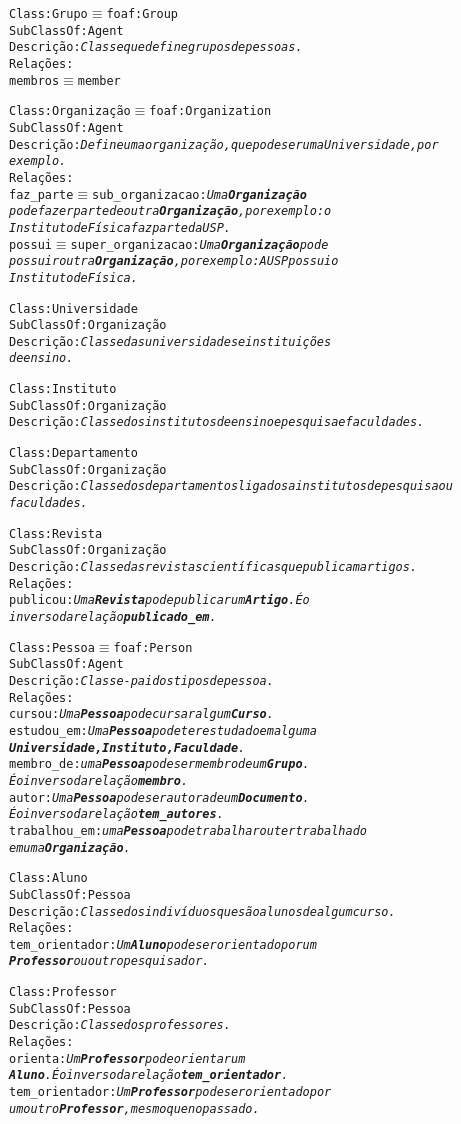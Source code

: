 \begin{alltt}
Class: Grupo \( \equiv \) foaf:Group
SubClassOf: Agent
Descrição: \emph{Classe que define grupos de pessoas.}
Relações:
  membros \( \equiv \) member

Class: Organização \( \equiv \) foaf:Organization
SubClassOf: Agent
Descrição: \emph{Define uma organização, que pode ser uma Universidade, por
exemplo.}
Relações:
  faz_parte \( \equiv \) sub_organizacao: \emph{Uma \textbf{Organização}
  pode fazer parte de outra \textbf{Organização}, por exemplo: o
  Instituto de Física faz parte da USP.}
  possui \( \equiv \) super_organizacao: \emph{Uma \textbf{Organização} pode
  possuir outra \textbf{Organização}, por exemplo: A USP possui o
  Instituto de Física.}

Class: Universidade
SubClassOf: Organização
Descrição: \emph{Classe das universidades e instituições
de ensino.}

Class:Instituto
SubClassOf: Organização
Descrição: \emph{Classe dos institutos de ensino e pesquisa e faculdades.}

Class: Departamento
SubClassOf: Organização
Descrição: \emph{Classe dos departamentos ligados a institutos de pesquisa ou
faculdades.}

Class: Revista
SubClassOf: Organização
Descrição: \emph{Classe das revistas científicas que publicam artigos.}
Relações:
  publicou: \emph{Uma \textbf{Revista} pode publicar um \textbf{Artigo}. É o
  inverso da relação \textbf{publicado_em}.}

Class: Pessoa \( \equiv \) foaf:Person
SubClassOf: Agent
Descrição: \emph{Classe-pai dos tipos de pessoa.}
Relações:
  cursou: \emph{Uma \textbf{Pessoa} pode cursar algum \textbf{Curso}.}
  estudou_em: \emph{Uma \textbf{Pessoa} pode ter estudado em alguma
  \textbf{Universidade, Instituto, Faculdade}.}
  membro_de: \emph{uma \textbf{Pessoa} pode ser membro de um  \textbf{Grupo}.
  É o inverso da relação \textbf{membro}.}
  autor: \emph{Uma \textbf{Pessoa} pode ser autora de um  \textbf{Documento}.
  É o inverso da relação \textbf{tem_autores}.}
  trabalhou_em: \emph{uma \textbf{Pessoa} pode trabalhar ou ter trabalhado
  em uma \textbf{Organização}.}

Class: Aluno
SubClassOf: Pessoa
Descrição: \emph{Classe dos indivíduos que são alunos de algum curso.}
Relações:
  tem_orientador: \emph{Um \textbf{Aluno} pode ser orientado por um
  \textbf{Professor} ou outro pesquisador.}

Class: Professor
SubClassOf: Pessoa
Descrição: \emph{Classe dos professores.}
Relações:
  orienta: \emph{Um \textbf{Professor} pode orientar um
  \textbf{Aluno}. É o inverso da relação \textbf{tem_orientador}.}
  tem_orientador: \emph{Um \textbf{Professor} pode ser orientado por
  um outro \textbf{Professor}, mesmo que no passado.}


\end{alltt}
